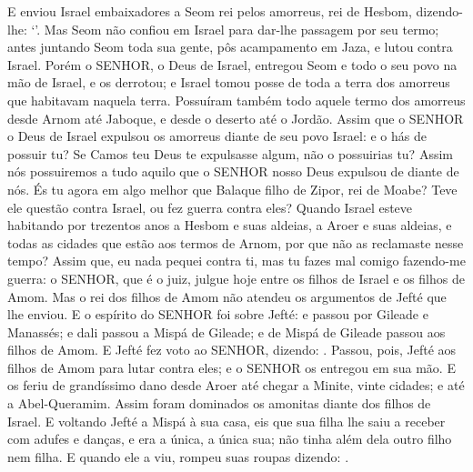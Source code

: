 {{{{  E enviou Israel embaixadores a Seom rei pelos amorreus, rei de Hesbom, dizendo-lhe: \enquote*{}.
  Mas Seom não confiou em Israel para dar-lhe passagem por seu termo; antes juntando Seom toda sua gente, pôs acampamento em Jaza, e lutou contra Israel.
  Porém o SENHOR, o Deus de Israel, entregou Seom e todo o seu povo na mão de Israel, e os derrotou; e Israel tomou posse de toda a terra dos amorreus que habitavam naquela terra.
  Possuíram também todo aquele termo dos amorreus desde Arnom até Jaboque, e desde o deserto até o Jordão.
  Assim que o SENHOR o Deus de Israel expulsou os amorreus diante de seu povo Israel: e o hás de possuir tu?
  Se Camos teu Deus te expulsasse algum, não o possuirias tu? Assim nós possuiremos a tudo aquilo que o SENHOR nosso Deus expulsou de diante de nós. %
  És tu agora em algo melhor que Balaque filho de Zipor, rei de Moabe? Teve ele questão contra Israel, ou fez guerra contra eles?
  Quando Israel esteve habitando por trezentos anos a Hesbom e suas aldeias, a Aroer e suas aldeias, e todas as cidades que estão aos termos de Arnom, por que não as reclamaste nesse tempo?
  Assim que, eu nada pequei contra ti, mas tu fazes mal comigo fazendo-me guerra: o SENHOR, que é o juiz, julgue hoje entre os filhos de Israel e os filhos de Amom}}}.
  Mas o rei dos filhos de Amom não atendeu os argumentos de Jefté que lhe enviou.
  E o espírito do SENHOR foi sobre Jefté: e passou por Gileade e Manassés; e dali passou a Mispá de Gileade; e de Mispá de Gileade passou aos filhos de Amom.
  E Jefté fez voto ao SENHOR, dizendo: .
  Passou, pois, Jefté aos filhos de Amom para lutar contra eles; e o SENHOR os entregou em sua mão.
  E os feriu de grandíssimo dano desde Aroer até chegar a Minite, vinte cidades; e até a Abel-Queramim. Assim foram dominados os amonitas diante dos filhos de Israel.
  E voltando Jefté a Mispá à sua casa, eis que sua filha lhe saiu a receber com adufes e danças, e era a única, a única sua; não tinha além dela outro filho nem filha.
  E quando ele a viu, rompeu suas roupas dizendo: .
}
